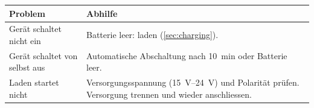 \begin{longtable}{p{5cm}p{10.5cm}}
    \rowcolor{gray} \textbf{Problem} & \textbf{Abhilfe} \\ \endhead
    Gerät schaltet nicht ein & Batterie leer: laden (\autoref{sec:charging}). \\
    Gerät schaltet von selbst aus & Automatische Abschaltung nach \qty{10}{\minute} oder Batterie leer. \\
    Laden startet nicht & Versorgungsspannung (\qtyrange{15}{24}{\volt}) und Polarität prüfen. Versorgung trennen und wieder anschliessen. \\
\end{longtable}
